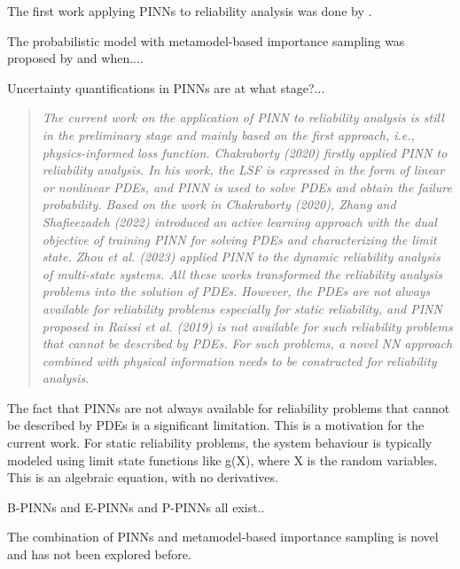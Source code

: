 The first work applying PINNs to reliability analysis was done by \citet{chakraborty2020simulationfreereliabilityanalysis}. 

The probabilistic model with metamodel-based importance sampling was proposed by and when....

Uncertainty quantifications in PINNs are at what stage?...
\begin{quotation}
    \textit{The current work on the application of PINN to reliability analysis is still in the preliminary stage and mainly based on the first approach, i.e., physics-informed loss function. Chakraborty (2020) firstly applied PINN to reliability analysis. In his work, the LSF is expressed in the form of linear or nonlinear PDEs, and PINN is used to solve PDEs and obtain the failure probability. Based on the work in Chakraborty (2020), Zhang and Shafieezadeh (2022) introduced an active learning approach with the dual objective of training PINN for solving PDEs and characterizing the limit state. Zhou et al. (2023) applied PINN to the dynamic reliability analysis of multi-state systems. All these works transformed the reliability analysis problems into the solution of PDEs. However, the PDEs are not always available for reliability problems especially for static reliability, and PINN proposed in Raissi et al. (2019) is not available for such reliability problems that cannot be described by PDEs. For such problems, a novel NN approach combined with physical information needs to be constructed for reliability analysis.} 
    \cite{bai2023reliability}
\end{quotation}

The fact that PINNs are not always available for reliability problems that cannot be described by PDEs is a significant limitation. This is a motivation for the current work. For static reliability problems, the system behaviour is typically modeled using limit state functions like g(X), where X is the random variables. This is an algebraic equation, with no derivatives. 



B-PINNs and E-PINNs and P-PINNs all exist..

The combination of PINNs and metamodel-based importance sampling is novel and has not been explored before. 

